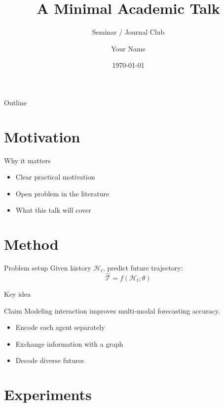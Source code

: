 \documentclass[aspectratio=169,10pt]{beamer}
\title{A Minimal Academic Talk}
\subtitle{Seminar / Journal Club}
\author{Your Name}
\institute{Your Lab / University}
\date{\today}
\begin{document}
\begin{frame}
  \titlepage
\end{frame}

\begin{frame}{Outline}
  \tableofcontents
\end{frame}

\section{Motivation}

\begin{frame}{Why it matters}
  \begin{itemize}
    \item Clear practical motivation
    \item Open problem in the literature
    \item What this talk will cover
  \end{itemize}
\end{frame}

\section{Method}

\begin{frame}{Problem setup}
  Given history $\mathcal{H}_{t}$, predict future trajectory:
  \begin{equation}
    \hat{\mathcal{T}} = f\!\left(\mathcal{H}_{t}; \theta\right)
  \end{equation}
\end{frame}

\begin{frame}{Key idea}
  \begin{block}{Claim}
    Modeling interaction improves multi-modal forecasting accuracy.
  \end{block}
  \begin{itemize}
    \item Encode each agent separately
    \item Exchange information with a graph
    \item Decode diverse futures
  \end{itemize}
\end{frame}

\section{Experiments}
\end{document}
